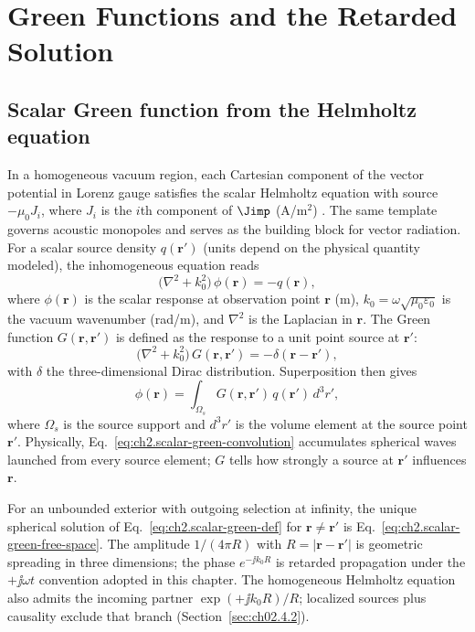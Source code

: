 
\section{Green Functions and the Retarded Solution}
\label{sec:ch02.4}

\subsection{Scalar Green function from the Helmholtz equation}
\label{sec:ch02.4.0}

In a homogeneous vacuum region, each Cartesian component of the vector potential in Lorenz gauge satisfies the scalar Helmholtz equation with source $-\mu_0 J_i$, where $J_i$ is the $i$th component of $\Jimp$ (A/m$^2$) \cite{stratton1941,jackson1999}. The same template governs acoustic monopoles and serves as the building block for vector radiation. For a scalar source density $q(\mathbf{r}')$ (units depend on the physical quantity modeled), the inhomogeneous equation reads
\begin{equation}
\label{eq:ch2.scalar-helmholtz-green-pde}
\big(\nabla^{2}+k_0^{2}\big)\,\phi(\mathbf{r})=-q(\mathbf{r}),
\end{equation}
where $\phi(\mathbf{r})$ is the scalar response at observation point $\mathbf{r}$ (m), $k_0=\omega\sqrt{\mu_0\varepsilon_0}$ is the vacuum wavenumber (rad/m), and $\nabla^2$ is the Laplacian in $\mathbf{r}$. The Green function $G(\mathbf{r},\mathbf{r}')$ is defined as the response to a unit point source at $\mathbf{r}'$:
\begin{equation}
\label{eq:ch2.scalar-green-def}
\big(\nabla^{2}+k_0^{2}\big)\,G(\mathbf{r},\mathbf{r}')=-\delta(\mathbf{r}-\mathbf{r}'),
\end{equation}
with $\delta$ the three-dimensional Dirac distribution. Superposition then gives
\begin{equation}
\label{eq:ch2.scalar-green-convolution}
\phi(\mathbf{r})=\int_{\Omega_s} G(\mathbf{r},\mathbf{r}')\,q(\mathbf{r}')\,d^{3}r',
\end{equation}
where $\Omega_s$ is the source support and $d^3r'$ is the volume element at the source point $\mathbf{r}'$. Physically, Eq.~\eqref{eq:ch2.scalar-green-convolution} accumulates spherical waves launched from every source element; $G$ tells how strongly a source at $\mathbf{r}'$ influences $\mathbf{r}$.

For an unbounded exterior with outgoing selection at infinity, the unique spherical solution of Eq.~\eqref{eq:ch2.scalar-green-def} for $\mathbf{r}\neq\mathbf{r}'$ is Eq.~\eqref{eq:ch2.scalar-green-free-space}. The amplitude $1/(4\pi R)$ with $R=|\mathbf{r}-\mathbf{r}'|$ is geometric spreading in three dimensions; the phase $e^{-\jj k_0 R}$ is retarded propagation under the $+\jj\omega t$ convention adopted in this chapter. The homogeneous Helmholtz equation also admits the incoming partner $\exp(+\jj k_0 R)/R$; localized sources plus causality exclude that branch (Section~\ref{sec:ch02.4.2}).

